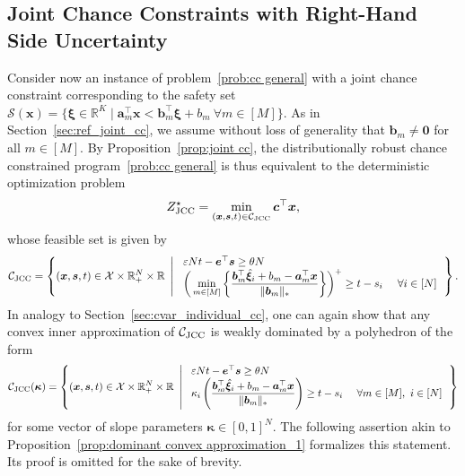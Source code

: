 \documentclass[nonblindrev]{informs2017}
\newcommand{\bmh}[1]{\hat{\bm{#1}}}
\newcommand{\1}[1]{\mathds{1}{\left(#1\right)}}
\begin{document}
\subsection{Joint Chance Constraints with Right-Hand Side Uncertainty}
\label{sec:cvar_joint_cc}
Consider now an instance of problem~\eqref{prob:cc general} with a joint chance constraint corresponding to the safety set $\mathcal{S}(\bm{x}) = \{\bm{\xi} \in \mathbb{R}^K \mid \bm{a}^\top_m \bm{x} < \bm{b}^\top_m\bm{\xi} + b_m ~\forall m \in [M]\}$. As in Section~\ref{sec:ref_joint_cc}, we assume without loss of generality that $\bm{b}_m \ne \bm{0}$ for all $m \in [M]$. By Proposition~\ref{prop:joint cc}, the distributionally robust chance constrained program~\eqref{prob:cc general} is thus equivalent to the deterministic optimization problem
\begin{equation}
\label{prob:joint cc reformulation abstract}
Z^\star_{\rm JCC}= \min_{(\bm{x},\bm{s}, t)\in \mathcal{C}_{\rm JCC}} \bm c^\top \bm x,
\end{equation}
whose feasible set is given by
\begin{equation*}
\mathcal{C}_{\rm JCC} = \left\{(\bm{x},\bm{s}, t) \in \mathcal{X} \times \mathbb{R}^N_+ \times \mathbb{R} ~\left|~
\begin{array}{ll}
\varepsilon N t - \bm{e}^\top\bm{s} \geq \theta N \\
\bigg(\displaystyle \min_{m \in [M]}
\bigg\{\dfrac{\bm{b}^\top_m\bmh{\xi}_i + b_m - \bm{a}^\top_m\bm{x}}{\|\bm{b}_m\|_*} \bigg\}\bigg)^+ \geq t - s_i &~\forall i \in [N] \\
\end{array}
\right.\right\}.
\end{equation*}	
In analogy to Section~\ref{sec:cvar_individual_cc}, one can again show that any convex inner approximation of $\mathcal{C}_{\rm JCC}$ is weakly dominated by a polyhedron of the form
\begin{equation*}
\mathcal{C}_{\rm JCC}(\bm{\kappa}) = \left\{(\bm{x},\bm{s}, t) \in \mathcal{X} \times \mathbb{R}^N_+ \times \mathbb{R} ~\left|~
\begin{array}{ll}
\varepsilon N t - \bm{e}^\top\bm{s} \geq \theta N \\
\kappa_i \left(\displaystyle
\dfrac{\bm{b}^\top_m\bmh{\xi}_i + b_m - \bm{a}^\top_m\bm{x}}{\|\bm{b}_m\|_*} \right) \geq t - s_i &~\forall m \in [M], ~i \in [N]  \\
\end{array}
\right.\right\}
\end{equation*}	
for some vector of slope parameters $\bm{\kappa} \in [0,1]^N$. The following assertion akin to Proposition~\ref{prop:dominant convex approximation_1} formalizes this statement. Its proof is omitted for the sake of brevity.
\end{document}
